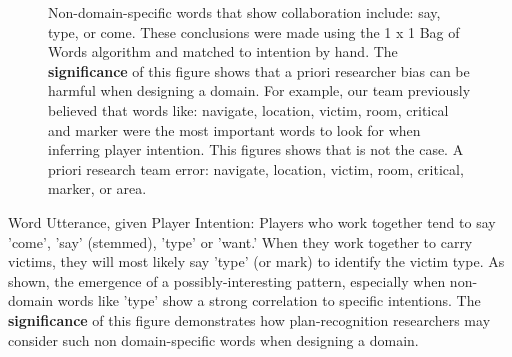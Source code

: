 \begin{figure}[h!]
    \centering
    \caption{Non-domain-specific words that show collaboration include: say, type, or come. These conclusions were made using the 1 x 1 Bag of Words algorithm and matched to intention by hand. The \textbf{significance} of this figure shows that a priori researcher bias can be harmful when designing a domain. For example, our team previously believed that words like: navigate, location, victim, room, critical and marker were the most important words to look for when inferring player intention. This figures shows that is not the case. A priori research team error: navigate, location, victim, room, critical, marker, or area.}
    \end{figure}
    
   

Word Utterance, given Player Intention: Players who work together tend to say  'come', 'say' (stemmed), 'type' or 'want.' When they work together to carry victims, they will most likely say 'type' (or mark) to identify the victim type. As shown, the emergence of a possibly-interesting pattern, especially when non-domain words like 'type' show a strong correlation to specific intentions. The \textbf{significance} of this figure demonstrates how plan-recognition researchers may consider such non domain-specific words when designing a domain.



